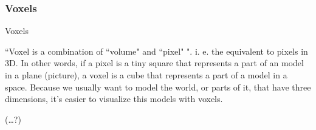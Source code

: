 
 \subsubsection{Voxels} %
 \label{ssub:voxels}
 Voxels

``Voxel is a combination of ``volume" and ``pixel" ". i. e. the equivalent to pixels in 3D. In other words, if a pixel is a tiny square that represents a part of an model in a plane (picture), a voxel is a cube that represents a part of a model in a space.
Because we usually want to model the world, or parts of it, that have three dimensions, it's easier to visualize this models with voxels.

(\dots?)
